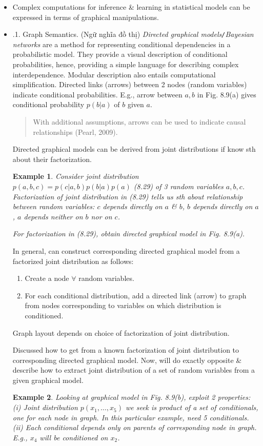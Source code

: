 \documentclass{article}
\newtheorem{example}{Example}
\begin{document}
\begin{itemize}
\begin{itemize}
\begin{itemize}
			\item Complex computations for inference \& learning in statistical models can be expressed in terms of graphical manipulations.
		\end{itemize}
		\begin{itemize}
			\item {.1. Graph Semantics.} (Ngữ nghĩa đồ thị) {\it Directed graphical models{\tt/}Bayesian networks} are a method for representing conditional dependencies in a probabilistic model. They provide a visual description of conditional probabilities, hence, providing a simple language for describing complex interdependence. Modular description also entails computational simplification. Directed links (arrows) between 2 nodes (random variables) indicate conditional probabilities. E.g., arrow between $a,b$ in {\sf Fig. 8.9(a)} gives conditional probability $p(b|a)$ of $b$ given $a$.
			\begin{quote}
				With additional assumptions, arrows can be used to indicate causal relationships (Pearl, 2009).
			\end{quote}
			Directed graphical models can be derived from joint distributions if know sth about their factorization.
			\begin{example}
				Consider joint distribution $p(a,b,c) = p(c|a,b)p(b|a)p(a)$ (8.29) of 3 random variables $a,b,c$. Factorization of joint distribution in (8.29) tells us sth about relationship between random variables: $c$ depends directly on $a$ \& $b$, $b$ depends directly on $a$, $a$ depends neither on $b$ nor on $c$.
				
				For factorization in (8.29), obtain directed graphical model in {\sf Fig. 8.9(a)}.
			\end{example}
			In general, can construct corresponding directed graphical model from a factorized joint distribution as follows:
			\begin{enumerate}
				\item Create a node $\forall$ random variables.
				\item For each conditional distribution, add a directed link (arrow) to graph from nodes corresponding to variables on which distribution is conditioned.
			\end{enumerate}
			 Graph layout depends on choice of factorization of joint distribution.
			
			Discussed how to get from a known factorization of joint distribution to corresponding directed graphical model. Now, will do exactly opposite \& describe how to extract joint distribution of a set of random variables from a given graphical model.
			\begin{example}
				Looking at graphical model in {\sf Fig. 8.9(b)}, exploit 2 properties: (i) Joint distribution $p(x_1,\ldots,x_5)$ we seek is product of a set of conditionals, one for each node in graph. In this particular example, need 5 conditionals. (ii) Each conditional depends only on parents of corresponding node in graph. E.g., $x_4$ will be conditioned on $x_2$.
				

\end{example}
\end{itemize}
\end{itemize}
\end{itemize}
\end{document}
